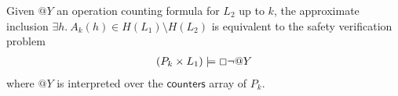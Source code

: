 \begin{theorem}

  Given $@Y$ an operation counting formula for $L_2$ up to $k$, the approximate
  inclusion $\exists h.\ A_k(h) \in H(L_1) \setminus H(L_2)$ is equivalent to
  the safety verification problem
  \begin{align*}
    (P_k \times L_1) |= \Box \lnot @Y
  \end{align*}
  where $@Y$ is interpreted over the $\mathsf{counters}$ array of $P_k$.

\end{theorem}

%
%
%
%
%
%
%
%
%
